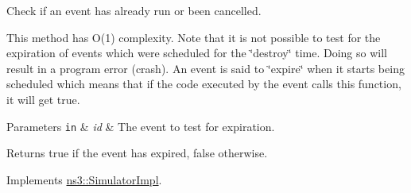Check if an event has already run or been cancelled.

This method has O(1) complexity. Note that it is not possible to test for the expiration of events which were scheduled for the \char`\"{}destroy\char`\"{} time. Doing so will result in a program error (crash). An event is said to \char`\"{}expire\char`\"{} when it starts being scheduled which means that if the code executed by the event calls this function, it will get true.


\begin{DoxyParams}[1]{Parameters}
\mbox{\tt in}  & {\em id} & The event to test for expiration. \\
\hline
\end{DoxyParams}
\begin{DoxyReturn}{Returns}
{\ttfamily true} if the event has expired, false otherwise. 
\end{DoxyReturn}


Implements \hyperlink{classns3_1_1SimulatorImpl_a4b01ac397f5ce86997e9caec087f63d2}{ns3\+::\+Simulator\+Impl}.


